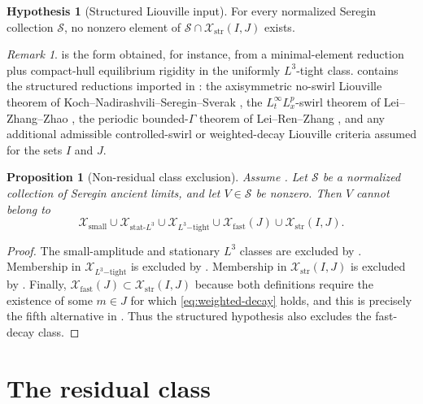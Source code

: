 \documentclass[11pt]{amsart}
\theoremstyle{plain}
\newtheorem{proposition}[theorem]{Proposition}
\theoremstyle{definition}
\newtheorem{hypothesis}[theorem]{Hypothesis}
\theoremstyle{remark}
\newtheorem{remark}[theorem]{Remark}
\numberwithin{equation}{section}
\begin{document}
\begin{hypothesis}[Structured Liouville input]\label{hyp:structured-liouville}
For every normalized Seregin collection \(\mathcal S\), no nonzero element of
\(\mathcal S\cap\mathcal X_{\mathrm{str}}(I,J)\) exists.
\end{hypothesis}

\begin{remark}\label{rem:hypotheses}
 is the form obtained, for instance, from a
minimal-element reduction plus compact-hull equilibrium rigidity in the
uniformly \(L^3\)-tight class.   contains the
structured reductions imported in : the
axisymmetric no-swirl Liouville theorem of Koch--Nadirashvili--Seregin--Sverak
\cite{KNSS2009}, the \(L_t^\infty L_x^p\)-swirl theorem of Lei--Zhang--Zhao
\cite{LZZ2017}, the periodic bounded-\(\Gamma\) theorem of Lei--Ren--Zhang
\cite{LRZ2022}, and any additional admissible controlled-swirl or
weighted-decay Liouville criteria assumed for the sets \(I\) and \(J\).
\end{remark}

\begin{proposition}[Non-residual class exclusion]\label{prop:closed-branch-exclusion}
Assume .  Let
\(\mathcal S\) be a normalized collection of Seregin ancient limits, and let
\(V\in\mathcal S\) be nonzero.  Then \(V\) cannot belong to
\[
   \mathcal X_{\mathrm{small}}
   \cup
   \mathcal X_{\mathrm{stat}\text{-}L^3}
   \cup
   \mathcal X_{L^3\mathrm{-tight}}
   \cup
   \mathcal X_{\mathrm{fast}}(J)
   \cup
   \mathcal X_{\mathrm{str}}(I,J).
\]
\end{proposition}

\begin{proof}
The small-amplitude and stationary \(L^3\) classes are excluded by
.
Membership in \(\mathcal X_{L^3\mathrm{-tight}}\) is excluded by
.  Membership in
\(\mathcal X_{\mathrm{str}}(I,J)\) is excluded by
.  Finally,
\(\mathcal X_{\mathrm{fast}}(J)\subset\mathcal X_{\mathrm{str}}(I,J)\) because
both definitions require the existence of some \(m\in J\) for which
\eqref{eq:weighted-decay} holds, and this is precisely the fifth alternative in
.  Thus the structured hypothesis also excludes
the fast-decay class.
\end{proof}

\section{The residual class}
\end{document}
